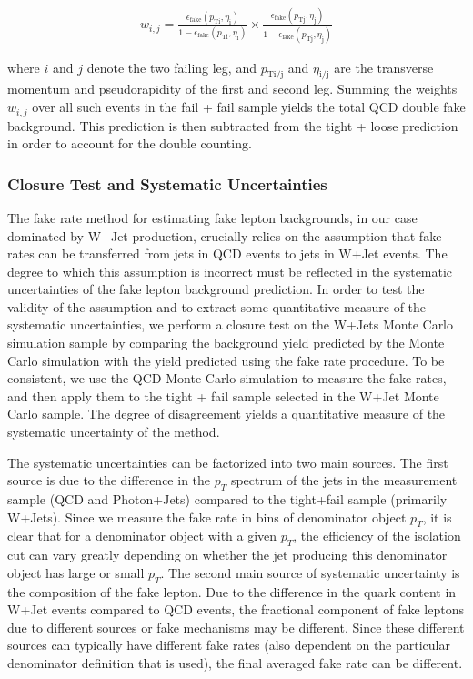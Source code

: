 \begin{eqnarray}
  w_{i,j} = \frac{\epsilon_{\mathrm{fake}}(p_{\mathrm{T i}},\eta_{\mathrm{i}})}{1 - \epsilon_{\mathrm{fake}}(p_{\mathrm{T i}},\eta_{\mathrm{i}})} \times \frac{\epsilon_{\mathrm{fake}}(p_{\mathrm{T j}},\eta_{\mathrm{j}})}{1 - \epsilon_{\mathrm{fake}}(p_{\mathrm{T j}},\eta_{\mathrm{j}})}
\end{eqnarray}

where $i$ and $j$ denote the two failing leg, and $p_{\mathrm{T i/j}}$ and $\eta_{\mathrm{i/j}}$
are the transverse momentum and pseudorapidity of the first and second leg.
Summing the weights $w_{i,j}$ over all such events in the fail + fail sample yields
the total QCD double fake background. This prediction is then subtracted from the
tight + loose prediction in order to account for the double counting. 

\subsubsection{Closure Test and Systematic Uncertainties}
\label{sec:fakerateSystematics}

The fake rate method for estimating fake lepton backgrounds, in our case
dominated by W+Jet production, crucially relies on the assumption that
fake rates can be transferred from jets in QCD events to jets in W+Jet
events. The degree to which this assumption is incorrect must be 
reflected in the systematic uncertainties of the fake lepton 
background prediction. In order to test the validity of the assumption
and to extract some quantitative measure of the systematic uncertainties,
we perform a closure test on the W+Jets Monte Carlo simulation sample by 
comparing the background yield predicted by the Monte Carlo simulation
with the yield predicted using the fake rate procedure. To be consistent,
we use the QCD Monte Carlo simulation to measure the fake rates, and then
apply them to the tight + fail sample selected in the W+Jet Monte Carlo
sample. The degree of disagreement yields a quantitative measure of the 
systematic uncertainty of the method.

The systematic uncertainties can be factorized into two main sources. 
The first source is due to the difference in the $p_{T}$ spectrum 
of the jets in the measurement sample (QCD and Photon+Jets) compared
to the tight+fail sample (primarily W+Jets). Since we measure the 
fake rate in bins of denominator object $p_{T}$, it is clear that
for a denominator object with a given $p_{T}$, the efficiency of the
isolation cut can vary greatly depending on whether the jet producing
this denominator object has large or small $p_{T}$. The second main
source of systematic uncertainty is the composition of the fake lepton.
Due to the difference in the quark content in W+Jet events compared
to QCD events, the fractional component of fake leptons due to different 
sources or fake mechanisms may be different. Since these different sources
can typically have different fake rates (also dependent on the particular 
denominator definition that is used), the final averaged fake rate can 
be different.

